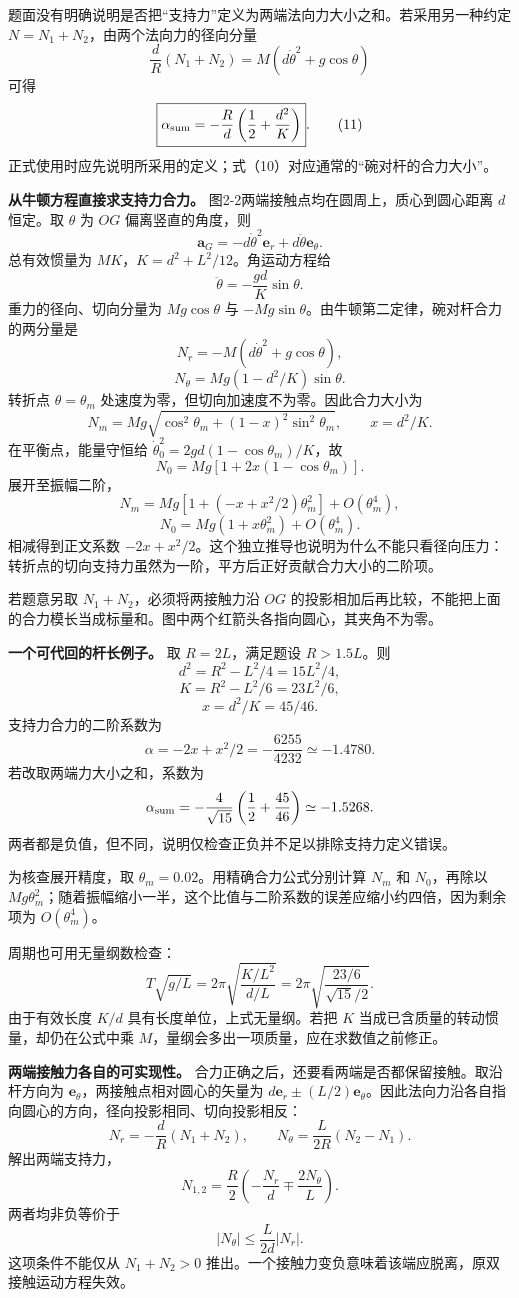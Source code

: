 \documentclass[12pt,a4paper,UTF8]{ctexart}
\begin{document}
题面没有明确说明是否把``支持力''定义为两端法向力大小之和。若采用另一种约定
\(N=N_1+N_2\)，由两个法向力的径向分量 \[
\frac dR(N_1+N_2)=M(d\dot\theta^2+g\cos\theta)
\] 可得 \[
\boxed{
\alpha_{\rm sum}
=-\frac Rd\left(\frac12+\frac{d^2}{K}\right)
}. \tag{11}
\]
正式使用时应先说明所采用的定义；式（10）对应通常的``碗对杆的合力大小''。

\textbf{从牛顿方程直接求支持力合力。}
图2-2两端接触点均在圆周上，质心到圆心距离 \(d\) 恒定。取 \(\theta\) 为
\(OG\) 偏离竖直的角度，则 \[
\bm a_G=-d\dot\theta^2\bm e_r+d\ddot\theta\bm e_\theta.
\] 总有效惯量为 \(MK\)，\(K=d^2+L^2/12\)。角运动方程给 \[
\ddot\theta=-\frac{gd}{K}\sin\theta.
\] 重力的径向、切向分量为 \(Mg\cos\theta\) 与
\(-Mg\sin\theta\)。由牛顿第二定律，碗对杆合力的两分量是 \[
N_r=-M(d\dot\theta^2+g\cos\theta),
\] \[
N_\theta=Mg(1-d^2/K)\sin\theta.
\] 转折点 \(\theta=\theta_m\)
处速度为零，但切向加速度不为零。因此合力大小为 \[
N_m=Mg\sqrt{\cos^2\theta_m+(1-x)^2\sin^2\theta_m},\qquad x=d^2/K.
\] 在平衡点，能量守恒给 \(\dot\theta_0^2=2gd(1-\cos\theta_m)/K\)，故 \[
N_0=Mg[1+2x(1-\cos\theta_m)].
\] 展开至振幅二阶， \[
N_m=Mg[1+(-x+x^2/2)\theta_m^2]+O(\theta_m^4),
\] \[
N_0=Mg(1+x\theta_m^2)+O(\theta_m^4).
\] 相减得到正文系数
\(-2x+x^2/2\)。这个独立推导也说明为什么不能只看径向压力：转折点的切向支持力虽然为一阶，平方后正好贡献合力大小的二阶项。

若题意另取 \(N_1+N_2\)，必须将两接触力沿 \(OG\)
的投影相加后再比较，不能把上面的合力模长当成标量和。图中两个红箭头各指向圆心，其夹角不为零。

\textbf{一个可代回的杆长例子。} 取 \(R=2L\)，满足题设 \(R>1.5L\)。则 \[
d^2=R^2-L^2/4=15L^2/4,
\] \[
K=R^2-L^2/6=23L^2/6,
\] \[
x=d^2/K=45/46.
\] 支持力合力的二阶系数为 \[
\alpha=-2x+x^2/2=-\frac{6255}{4232}\simeq-1.4780.
\] 若改取两端力大小之和，系数为 \[
\alpha_{\rm sum}=-\frac{4}{\sqrt{15}}\left(\frac12+\frac{45}{46}\right)\simeq-1.5268.
\] 两者都是负值，但不同，说明仅检查正负并不足以排除支持力定义错误。

为核查展开精度，取 \(\theta_m=0.02\)。用精确合力公式分别计算 \(N_m\) 和
\(N_0\)，再除以
\(Mg\theta_m^2\)；随着振幅缩小一半，这个比值与二阶系数的误差应缩小约四倍，因为剩余项为
\(O(\theta_m^4)\)。

周期也可用无量纲数检查： \[
T\sqrt{g/L}=2\pi\sqrt{\frac{K/L^2}{d/L}}
=2\pi\sqrt{\frac{23/6}{\sqrt{15}/2}}.
\] 由于有效长度 \(K/d\) 具有长度单位，上式无量纲。若把 \(K\)
当成已含质量的转动惯量，却仍在公式中乘
\(M\)，量纲会多出一项质量，应在求数值之前修正。

\textbf{两端接触力各自的可实现性。}
合力正确之后，还要看两端是否都保留接触。取沿杆方向为
\(\bm e_\theta\)，两接触点相对圆心的矢量为
\(d\bm e_r\pm(L/2)\bm e_\theta\)。因此法向力沿各自指向圆心的方向，径向投影相同、切向投影相反：
\[
N_r=-\frac dR(N_1+N_2),
\qquad N_\theta=\frac L{2R}(N_2-N_1).
\] 解出两端支持力， \[
N_{1,2}=\frac R2\left(-\frac{N_r}{d}\mp\frac{2N_\theta}{L}\right).
\] 两者均非负等价于 \[
|N_\theta|\le\frac L{2d}|N_r|.
\] 这项条件不能仅从 \(N_1+N_2>0\)
推出。一个接触力变负意味着该端应脱离，原双接触运动方程失效。
\end{document}
